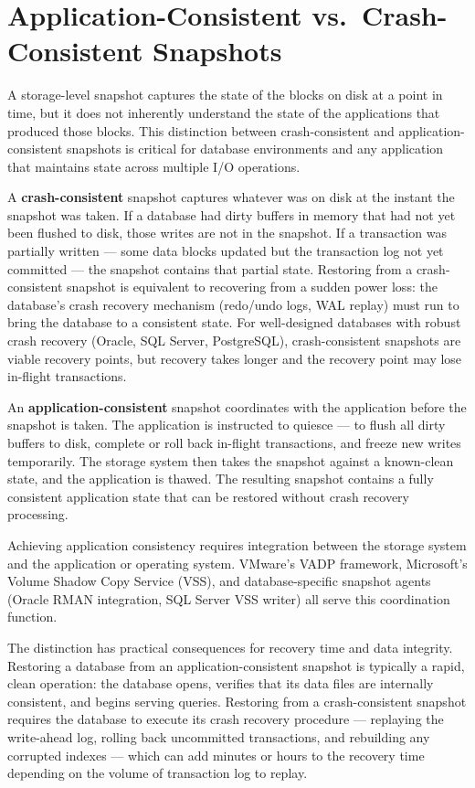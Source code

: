 \section{Application-Consistent vs.\ Crash-Consistent Snapshots}

A storage-level snapshot captures the state of the blocks on disk at a point in time, but it does not inherently understand the state of the applications that produced those blocks. This distinction between crash-consistent and application-consistent snapshots is critical for database environments and any application that maintains state across multiple I/O operations.

A \textbf{crash-consistent} snapshot captures whatever was on disk at the instant the snapshot was taken. If a database had dirty buffers in memory that had not yet been flushed to disk, those writes are not in the snapshot. If a transaction was partially written --- some data blocks updated but the transaction log not yet committed --- the snapshot contains that partial state. Restoring from a crash-consistent snapshot is equivalent to recovering from a sudden power loss: the database's crash recovery mechanism (redo/undo logs, WAL replay) must run to bring the database to a consistent state. For well-designed databases with robust crash recovery (Oracle, SQL Server, PostgreSQL), crash-consistent snapshots are viable recovery points, but recovery takes longer and the recovery point may lose in-flight transactions.

An \textbf{application-consistent} snapshot coordinates with the application before the snapshot is taken. The application is instructed to quiesce --- to flush all dirty buffers to disk, complete or roll back in-flight transactions, and freeze new writes temporarily. The storage system then takes the snapshot against a known-clean state, and the application is thawed. The resulting snapshot contains a fully consistent application state that can be restored without crash recovery processing.

Achieving application consistency requires integration between the storage system and the application or operating system. VMware's VADP framework, Microsoft's Volume Shadow Copy Service (VSS), and database-specific snapshot agents (Oracle RMAN integration, SQL Server VSS writer) all serve this coordination function.

The distinction has practical consequences for recovery time and data integrity. Restoring a database from an application-consistent snapshot is typically a rapid, clean operation: the database opens, verifies that its data files are internally consistent, and begins serving queries. Restoring from a crash-consistent snapshot requires the database to execute its crash recovery procedure --- replaying the write-ahead log, rolling back uncommitted transactions, and rebuilding any corrupted indexes --- which can add minutes or hours to the recovery time depending on the volume of transaction log to replay.

